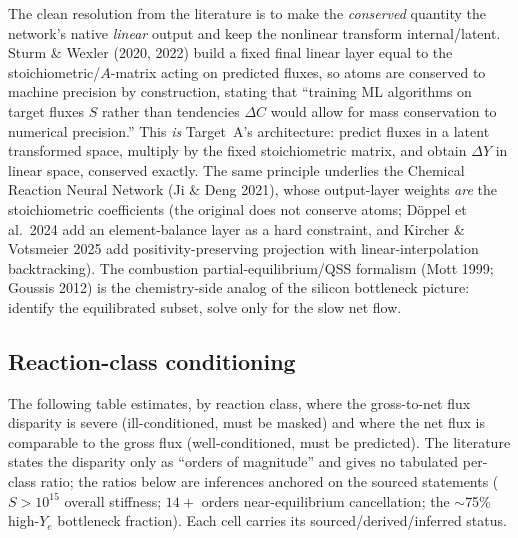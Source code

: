 \documentclass[11pt]{article}
\begin{document}
The clean resolution from the literature is to make the \emph{conserved} quantity the network's native \emph{linear} output and keep the nonlinear transform internal/latent. Sturm \& Wexler (2020, 2022) build a fixed final linear layer equal to the stoichiometric/$A$-matrix acting on predicted fluxes, so atoms are conserved to machine precision by construction, stating that ``training ML algorithms on target fluxes $S$ rather than tendencies $\Delta C$ would allow for mass conservation to numerical precision.'' This \emph{is} Target~A's architecture: predict fluxes in a latent transformed space, multiply by the fixed stoichiometric matrix, and obtain $\Delta Y$ in linear space, conserved exactly. The same principle underlies the Chemical Reaction Neural Network (Ji \& Deng 2021), whose output-layer weights \emph{are} the stoichiometric coefficients (the original does not conserve atoms; D\"oppel et al.\ 2024 add an element-balance layer as a hard constraint, and Kircher \& Votsmeier 2025 add positivity-preserving projection with linear-interpolation backtracking). The combustion partial-equilibrium/QSS formalism (Mott 1999; Goussis 2012) is the chemistry-side analog of the silicon bottleneck picture: identify the equilibrated subset, solve only for the slow net flow.

\subsection{Reaction-class conditioning}

The following table estimates, by reaction class, where the gross-to-net flux disparity is severe (ill-conditioned, must be masked) and where the net flux is comparable to the gross flux (well-conditioned, must be predicted). The literature states the disparity only as ``orders of magnitude'' and gives no tabulated per-class ratio; the ratios below are inferences anchored on the sourced statements ($S > 10^{15}$ overall stiffness; $14+$ orders near-equilibrium cancellation; the $\sim$75\% high-$Y_e$ bottleneck fraction). Each cell carries its sourced/derived/inferred status.
\end{document}
